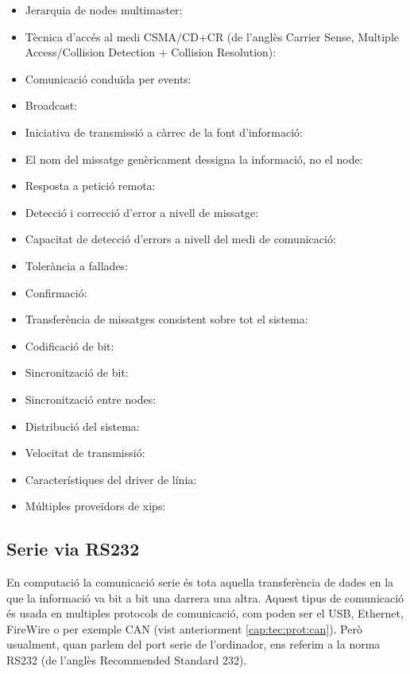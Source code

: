 \begin{itemize}
	\item Jerarquia de nodes multimaster:
	\item Tècnica d'accés al medi CSMA/CD+CR (de l'anglès Carrier Sense, Multiple Access/Collision Detection + Collision Resolution):
	\item Comunicació conduïda per events:
	\item Broadcast:
	\item Iniciativa de transmissió a càrrec de la font d'informació:
	\item El nom del missatge genèricament dessigna la informació, no el node:
	\item Resposta a petició remota:
	\item Detecció i correcció d'error a nivell de missatge:
	\item Capacitat de detecció d'errors a nivell del medi de comunicació:
	\item Tolerància a fallades:
	\item Confirmació:
	\item Transferència de missatges consistent sobre tot el sistema:
	\item Codificació de bit:
	\item Sincronització de bit:
	\item Sincronització entre nodes:
	\item Distribució del sistema:
	\item Velocitat de transmissió:
	\item Característiques del driver de línia:
	\item Múltiples proveïdors de xips:
\end{itemize}

\subsection{Serie via RS232}\label{cap:tec:prot:rs232}

En computació la comunicació serie és tota aquella transferència de dades en la que la informació va bit a bit una darrera una altra. Aquest tipus de comunicació és usada en multiples protocols de comunicació, com poden ser el USB, Ethernet, FireWire o per exemple CAN (vist anteriorment \ref{cap:tec:prot:can}). Però usualment, quan parlem del port serie de l'ordinador, ens referim a la norma RS232 (de l'anglès Recommended Standard 232).

